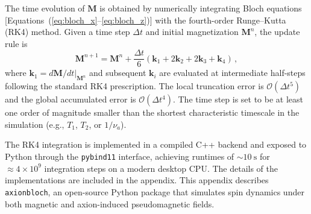 
The time evolution of $\boldsymbol{M}$ is obtained by numerically integrating Bloch equations [Equations~(\ref{eq:bloch_x}--\ref{eq:bloch_z})] with the fourth-order Runge--Kutta (RK4) method.
Given a time step $\Delta t$ and initial magnetization $\boldsymbol{M}^n$, the update rule is
\begin{equation}
    \boldsymbol{M}^{n+1} = \boldsymbol{M}^n + \frac{\Delta t}{6}\left(\boldsymbol{k}_1 + 2\boldsymbol{k}_2 + 2\boldsymbol{k}_3 + \boldsymbol{k}_4\right)\,,
\end{equation}
where $\boldsymbol{k}_1 = d\boldsymbol{M}/dt|_{\boldsymbol{M}^n}$ and subsequent $\boldsymbol{k}_i$ are evaluated at intermediate half-steps following the standard RK4 prescription.
The local truncation error is $\mathcal{O}(\Delta t^5)$ and the global accumulated error is $\mathcal{O}(\Delta t^4)$.
The time step is set to be at least one order of magnitude smaller than the shortest characteristic timescale in the simulation (e.g., $T_1$, $T_2$, or $1/\nu_a$).

The RK4 integration is implemented in a compiled C++ backend and exposed to Python through the \texttt{pybind11} interface, achieving runtimes of $\sim\SI{10}{\s}$ for $\approx4\times10^9$ integration steps on a modern desktop CPU.
The details of the implementations are included in the appendix.
This appendix describes \texttt{axionbloch}, an open-source Python package that simulates spin dynamics under both magnetic and axion-induced pseudomagnetic fields.

